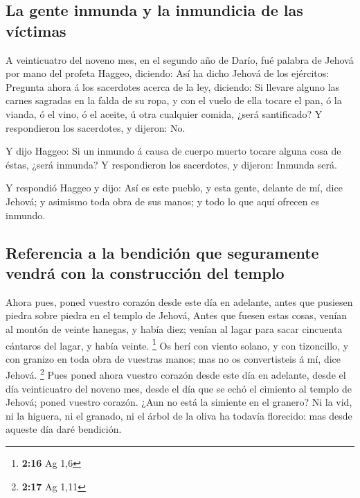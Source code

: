 \hypertarget{la-gente-inmunda-y-la-inmundicia-de-las-vuxedctimas}{%
\subsection{La gente inmunda y la inmundicia de las
víctimas}\label{la-gente-inmunda-y-la-inmundicia-de-las-vuxedctimas}}

 A veinticuatro del noveno mes, en el segundo año de Darío,
fué palabra de Jehová por mano del profeta Haggeo, diciendo:
 Así ha dicho Jehová de los ejércitos: Pregunta ahora á los
sacerdotes acerca de la ley, diciendo:  Si llevare alguno
las carnes sagradas en la falda de su ropa, y con el vuelo de ella
tocare el pan, ó la vianda, ó el vino, ó el aceite, ú otra cualquier
comida, ¿será santificado? Y respondieron los sacerdotes, y dijeron:
No.~

 Y dijo Haggeo: Si un inmundo á causa de cuerpo muerto
tocare alguna cosa de éstas, ¿será inmunda? Y respondieron los
sacerdotes, y dijeron: Inmunda será.

 Y respondió Haggeo y dijo: Así es este pueblo, y esta
gente, delante de mí, dice Jehová; y asimismo toda obra de sus manos; y
todo lo que aquí ofrecen es inmundo.

\hypertarget{referencia-a-la-bendiciuxf3n-que-seguramente-vendruxe1-con-la-construcciuxf3n-del-templo}{%
\subsection{Referencia a la bendición que seguramente vendrá con la
construcción del
templo}\label{referencia-a-la-bendiciuxf3n-que-seguramente-vendruxe1-con-la-construcciuxf3n-del-templo}}

 Ahora pues, poned vuestro corazón desde este día en
adelante, antes que pusiesen piedra sobre piedra en el templo de Jehová,
 Antes que fuesen estas cosas, venían al montón de veinte
hanegas, y había diez; venían al lagar para sacar cincuenta cántaros del
lagar, y había veinte. \footnote{\textbf{2:16} Ag 1,6}  Os
herí con viento solano, y con tizoncillo, y con granizo en toda obra de
vuestras manos; mas no os convertisteis á mí, dice Jehová. \footnote{\textbf{2:17}
  Ag 1,11}  Pues poned ahora vuestro corazón desde este día
en adelante, desde el día veinticuatro del noveno mes, desde el día que
se echó el cimiento al templo de Jehová; poned vuestro corazón.
 ¿Aun no está la simiente en el granero? Ni la vid, ni la
higuera, ni el granado, ni el árbol de la oliva ha todavía florecido:
mas desde aqueste día daré bendición.

